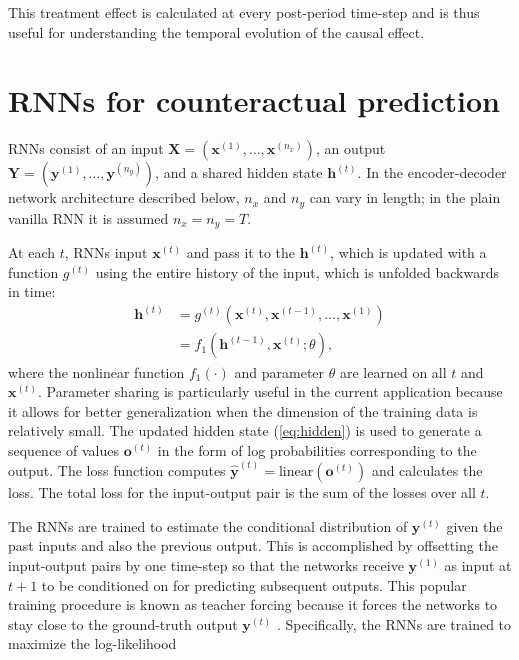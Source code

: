\documentclass[hidelinks,12pt]{article}
\begin{document}
This treatment effect is calculated at every post-period time-step and is thus useful for understanding the temporal evolution of the causal effect.

\section{RNNs for counteractual prediction} \label{RNNs-section}

RNNs \citep{graves2012,goodfellow2016deep} consist of an input $\boldsymbol{X} = \left(\boldsymbol{x}^{(1)}, \ldots, \boldsymbol{x}^{(n_x)}\right)$, an output $\boldsymbol{Y} = \left(\boldsymbol{y}^{(1)}, \ldots, \boldsymbol{y}^{(n_y)}\right)$, and a shared hidden state $\boldsymbol{h}^{(t)}$. In the encoder-decoder network architecture described below, $n_x$ and $n_y$ can vary in length; in the plain vanilla RNN it is assumed $n_x = n_y = T$.  

At each $t$, RNNs input $\boldsymbol{x}^{(t)}$ and pass it to the $\boldsymbol{h}^{(t)}$, which is updated with a function $g^{(t)}$ using the entire history of the input, which is unfolded backwards in time:
%
\begin{align}
\boldsymbol{h}^{(t)} &= g^{(t)} \left(\boldsymbol{x}^{(t)}, \boldsymbol{x}^{(t-1)}, \ldots, \boldsymbol{x}^{(1)} \right) \nonumber \\ 
&= f_1 \left( \boldsymbol{h}^{(t-1)}, \boldsymbol{x}^{(t)}; \theta \right), \label{eq:hidden}
\end{align} where the nonlinear function $f_1(\cdot)$ and parameter $\theta$ are learned on all $t$ and $\boldsymbol{x}^{(t)}$. Parameter sharing is particularly useful in the current application because it allows for better generalization when the dimension of the training data is relatively small. The updated hidden state (\ref{eq:hidden}) is used to generate a sequence of values $\boldsymbol{o}^{(t)}$ in the form of log probabilities corresponding to the output. The loss function computes $\boldsymbol{\hat{y}}^{(t)} = \mathrm{linear} (\boldsymbol{o}^{(t)})$ and calculates the loss. The total loss for the input-output pair is the sum of the losses over all $t$.

The RNNs are trained to estimate the conditional distribution of $\boldsymbol{y}^{(t)}$ given the past inputs and also the previous output. This is accomplished by offsetting the input-output pairs by one time-step so that the networks receive $\boldsymbol{y}^{(1)}$  as input at $t + 1$ to be conditioned on for predicting subsequent outputs. This popular training procedure is known as teacher forcing because it forces the networks to stay close to the ground-truth output $\boldsymbol{y}^{(t)}$ \citep{lamb2016professor}. Specifically, the RNNs are trained to maximize the log-likelihood
\end{document}
